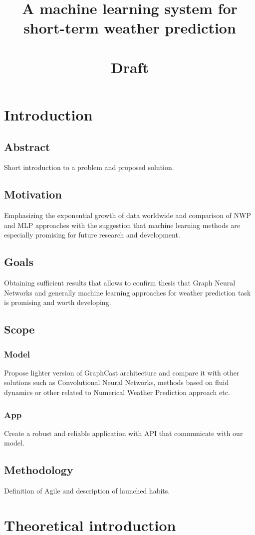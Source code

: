 \documentclass{article}
\title{%
	A machine learning system for short-term weather prediction \\ \, \\
	\large Draft}
\begin{document}
	
	\maketitle 
	\section{Introduction}
	\subsection{Abstract}
	Short introduction to a problem and proposed solution.
	\subsection{Motivation}
	Emphasizing the exponential growth of data worldwide and comparison of NWP and MLP approaches with the suggestion that machine learning methods are especially promising for future research and development.
	\subsection{Goals}
	Obtaining sufficient results that allows to confirm thesis that Graph Neural Networks and generally machine learning approaches for weather prediction task is promising and worth developing.
	\subsection{Scope}
	\subsubsection{Model}
	Propose lighter version of GraphCast architecture and compare it with other solutions such as Convolutional Neural Networks, methods based on fluid dynamics or other related to Numerical Weather Prediction approach etc.
	\subsubsection{App}
	Create a robust and reliable application with API that communicate with our model.
	\subsection{Methodology}
	Definition of Agile and description of launched habits. 
	
	\section{Theoretical introduction}
\end{document}
